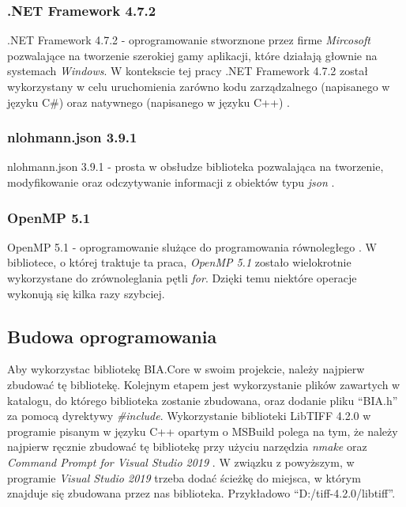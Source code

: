 \documentclass{article}
\begin{document}
        \subsubsection{.NET Framework 4.7.2}
        {
            \label{sec:.NETFramework 4.7.2}
            \Large
            \justifying
            \quad
            .NET Framework 4.7.2 - oprogramowanie stworznone przez firme \textit{Mircosoft} pozwalające na
            tworzenie szerokiej gamy aplikacji, które działają głownie na systemach \textit{Windows}.
            W kontekscie tej pracy .NET Framework 4.7.2 został wykorzystany w celu uruchomienia zarówno kodu zarządzalnego (napisanego w języku C\#)
            oraz natywnego (napisanego w języku C++) \cite{.NET Framework}.
        }
        \subsubsection{nlohmann.json 3.9.1}
        {
            \label{sec:nlohman.json 3.9.1}
            \Large
            \justifying
            \quad
            nlohmann.json 3.9.1 - prosta w obsłudze biblioteka pozwalająca na tworzenie, modyfikowanie oraz odczytywanie informacji
            z obiektów typu \textit{json} \cite{nlohmann.json 3.9.1}.
        }
        \subsubsection{OpenMP 5.1}
        {
            \label{sec:openmp}
            {
                \Large
                \justifying
                \quad
                \color{blue}
                {
                OpenMP 5.1 - oprogramowanie slużące do programowania równoległego \cite{OpenMP 5.1}.
                W bibliotece, o której traktuje ta praca, \emph{OpenMP 5.1} zostało wielokrotnie wykorzystane do zrównoleglania pętli \emph{for}.
                Dzięki temu niektóre operacje wykonują się kilka razy szybciej.
                }
            }
        }
        \subsection{Budowa oprogramowania}
        {
            \Large
            \justifying
            \quad
            Aby wykorzystac bibliotekę BIA.Core w swoim projekcie, należy najpierw zbudować tę bibliotekę.
            Kolejnym etapem jest wykorzystanie plików zawartych w katalogu, do którego biblioteka zostanie zbudowana,
            oraz dodanie pliku ``BIA.h'' za pomocą dyrektywy \textit{\#include}.
            Wykorzystanie biblioteki LibTIFF 4.2.0 w programie pisanym w języku C++ opartym o MSBuild polega na tym, że należy najpierw ręcznie zbudować tę bibliotekę przy użyciu narzędzia \textit{nmake} oraz \textit{Command Prompt for Visual Studio 2019} \cite{Biblioteka LibTIFF}.
            W związku z powyższym, w programie \textit{Visual Studio 2019} trzeba dodać ścieżkę do miejsca, w którym znajduje się zbudowana przez nas biblioteka.
            Przykładowo ``D:/tiff-4.2.0/libtiff''.
        }
\end{document}
